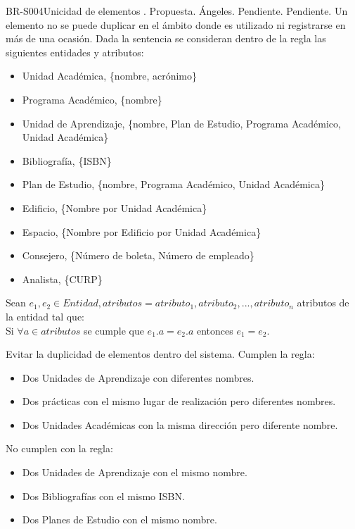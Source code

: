 \begin{BusinessRule}{BR-S004}{Unicidad de elementos}
	{\bcIntegridad}    %
	{\btEnabler}     %
	{\blControlling}    %
	.
	\BRItem[Estado] Propuesta.
	 Ángeles.
	 Pendiente.
	 Pendiente.
	\BRItem[Descripción] Un elemento no se puede duplicar en el ámbito donde es utilizado ni registrarse en más de una ocasión. Dada la sentencia se consideran dentro de la regla las siguientes entidades y atributos:
	
	\begin{itemize}
		\item Unidad Académica, \{nombre, acrónimo\}
		\item Programa Académico, \{nombre\}
		\item Unidad de Aprendizaje, \{nombre, Plan de Estudio, Programa Académico, Unidad Académica\}
		\item Bibliografía, \{ISBN\}
		\item Plan de Estudio, \{nombre, Programa Académico, Unidad Académica\}
		\item Edificio,    \{Nombre por Unidad Académica\}
		\item Espacio,     \{Nombre por Edificio por Unidad Académica\}
		\item Consejero,   \{Número de boleta, Número de empleado\}
		\item Analista,      \{CURP\}
	\end{itemize}
	\BRItem[Sentencia] Sean $ e_1, e_2 \in Entidad , atributos = {atributo_1, atributo_2,...,atributo_n}$ atributos de la entidad tal que:\\
	Si $ \forall a \in atributos$ se cumple que $ e_1.a = e_2.a$ entonces $ e_1 = e_2 $.
	
	\BRItem[Motivación] Evitar la duplicidad de elementos dentro del sistema.
	 Cumplen la regla:
	\begin{itemize}
		\item Dos Unidades de Aprendizaje con diferentes nombres.
		\item Dos prácticas con el mismo lugar de realización pero diferentes nombres.
		\item Dos Unidades Académicas con la misma dirección pero diferente nombre.
	\end{itemize}
	 No cumplen con la regla:
	\begin{itemize}
		\item Dos Unidades de Aprendizaje con el mismo nombre.
		\item Dos Bibliografías con el mismo ISBN.
		\item Dos Planes de Estudio con el mismo nombre.
	\end{itemize}
\end{BusinessRule}

